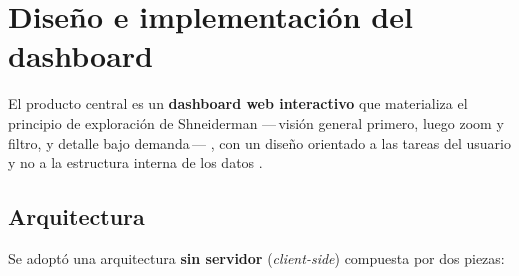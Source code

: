 \documentclass[12pt,a4paper]{article}
\begin{document}
\section{Diseño e implementación del dashboard}
\label{sec:dashboard}
El producto central es un \textbf{dashboard web interactivo} que materializa el
principio de exploración de Shneiderman ---\,visión general primero, luego zoom y
filtro, y detalle bajo demanda\,--- \cite{shneiderman1996}, con un diseño orientado
a las tareas del usuario y no a la estructura interna de los datos
\cite{munzner2014}.

\subsection{Arquitectura}
Se adoptó una arquitectura \textbf{sin servidor} (\emph{client-side}) compuesta por
dos piezas:
\end{document}

